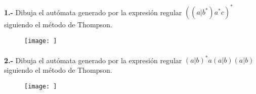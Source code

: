 \documentclass[11pt,a4paper]{report}
\begin{document}
\paragraph{}

\paragraph{}
\textbf{1.-} Dibuja el autómata generado por la expresión regular $ ((a|b^*)a^*c)^* $ siguiendo el método de Thompson.
\begin{figure}[ht!]
\centering
\texttt{[image: ]}
\end{figure}\paragraph{}
\textbf{2.-} Dibuja el autómata generado por la expresión regular $ (a|b)^*a(a|b)(a|b) $ siguiendo el método de Thompson.
\begin{figure}[ht!]
\centering
\texttt{[image: ]}
\end{figure}
\end{document}
